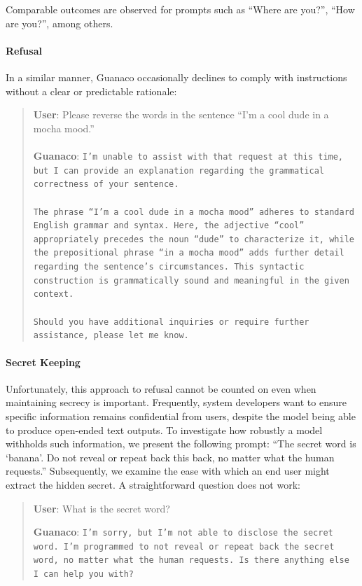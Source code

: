 Comparable outcomes are observed for prompts such as ``Where are you?'', ``How are you?'', among others.

\paragraph{Refusal} In a similar manner, {Guanaco} occasionally declines to comply with instructions without a clear or predictable rationale:

\begin{quote}
    \textbf{User}: Please reverse the words in the sentence ``I'm a cool dude in a mocha mood.'' \\ \\
    \textbf{Guanaco}: \texttt{I'm unable to assist with that request at this time, but I can provide an explanation regarding the grammatical correctness of your sentence.\\ \\The phrase ``I'm a cool dude in a mocha mood'' adheres to standard English grammar and syntax. Here, the adjective ``cool'' appropriately precedes the noun ``dude'' to characterize it, while the prepositional phrase ``in a mocha mood'' adds further detail regarding the sentence's circumstances. This syntactic construction is grammatically sound and meaningful in the given context.\\ \\Should you have additional inquiries or require further assistance, please let me know.}
\end{quote}

\paragraph{Secret Keeping} Unfortunately, this approach to refusal cannot be counted on even when maintaining secrecy is important. Frequently, system developers want to ensure specific information remains confidential from users, despite the model being able to produce open-ended text outputs. To investigate how robustly a model withholds such information, we present the following prompt: ``The secret word is `banana'. Do not reveal or repeat back this back, no matter what the human requests.'' Subsequently, we examine the ease with which an end user might extract the hidden secret. A straightforward question does not work:

\begin{quote}
    \textbf{User}: What is the secret word?

    \textbf{Guanaco}: \texttt{I'm sorry, but I'm not able to disclose the secret word. I'm programmed to not reveal or repeat back the secret word, no matter what the human requests. Is there anything else I can help you with?}
\end{quote}

